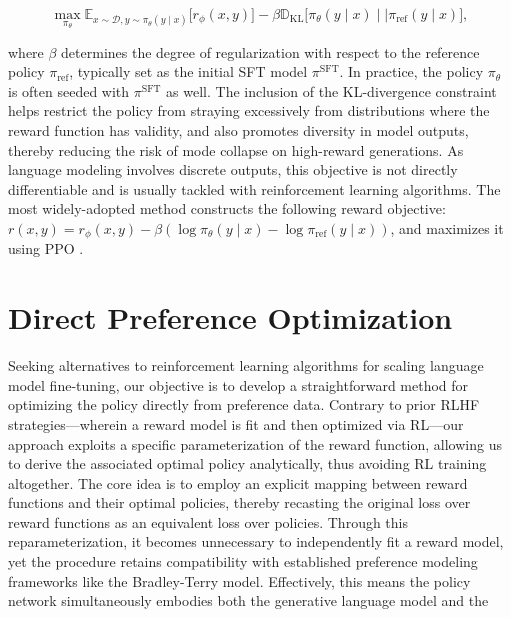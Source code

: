 \begin{equation}\label{eq:RL}
\max_{\pi_{\theta}}  \mathbb{E}_{x\sim \mathcal{D}, y\sim \pi_{\theta}(y \mid x)}\bigl[r_{\phi}(x, y)\bigr] - \beta\mathbb{D}_{\textrm{KL}}\bigl[\pi_{\theta}(y\mid x)\mid \mid \pi_\text{ref}(y\mid x)\bigr],
\end{equation}

where $\beta$ determines the degree of regularization with respect to the reference policy $\pi_\text{ref}$, typically set as the initial SFT model $\pi^\text{SFT}$. In practice, the policy $\pi_\theta$ is often seeded with $\pi^\text{SFT}$ as well. The inclusion of the KL-divergence constraint helps restrict the policy from straying excessively from distributions where the reward function has validity, and also promotes diversity in model outputs, thereby reducing the risk of mode collapse on high-reward generations. As language modeling involves discrete outputs, this objective is not directly differentiable and is usually tackled with reinforcement learning algorithms. The most widely-adopted method \citep{ziegler2020finetuning, stiennon2022learning, bai2022training, ouyang2022training} constructs the following reward objective: ${r(x, y) = r_{\phi}(x, y) -\beta (\log \pi_{\theta}(y\mid x) - \log \pi_\text{ref}(y\mid x))}$, and maximizes it using PPO \cite{schulman2017proximal}.

\section{Direct Preference Optimization}\label{sec:DPO}

Seeking alternatives to reinforcement learning algorithms for scaling language model fine-tuning, our objective is to develop a straightforward method for optimizing the policy directly from preference data. Contrary to prior RLHF strategies—wherein a reward model is fit and then optimized via RL—our approach exploits a specific parameterization of the reward function, allowing us to derive the associated optimal policy analytically, thus avoiding RL training altogether. The core idea is to employ an explicit mapping between reward functions and their optimal policies, thereby recasting the original loss over reward functions as an equivalent loss over policies. Through this reparameterization, it becomes unnecessary to independently fit a reward model, yet the procedure retains compatibility with established preference modeling frameworks like the Bradley-Terry model. Effectively, this means the policy network simultaneously embodies both the generative language model and the

